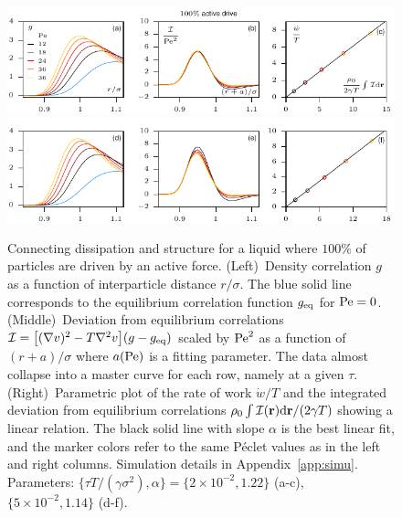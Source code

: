 \documentclass[superscriptaddress, twocolumn, prx, longbibliography, nofootinbib]{revtex4-1}
\begin{document}
\begin{figure}
	\centering
	\includegraphics[width=\linewidth]{fig2_ac_a.pdf}
	\includegraphics[width=\linewidth]{fig2_ac_b.pdf}
	\caption{\label{fig:fig2_ac}
		Connecting dissipation and structure for a liquid where $100\%$ of particles are driven by an active force.
		(Left)~Density correlation $g$ as a function of interparticle distance $r/\sigma$. The blue solid line corresponds to the equilibrium correlation function $g_{\rm eq}$ for ${\rm Pe}=0$.
		(Middle)~Deviation from equilibrium correlations ${\cal I} = \big[(\nabla v)^2-T\nabla^2v\big](g - g_{\rm eq})$ scaled by ${\rm Pe}^2$ as a function of $(r+a)/\sigma$ where $a({\rm Pe})$ is a fitting parameter. The data almost collapse into a master curve for each row, namely at a given $\tau$.
		(Right)~Parametric plot of the rate of work $\dot w/T$ and the integrated deviation from equilibrium correlations $\rho_0\int{\cal I}({\bf r}){\rm d}{\bf r}/(2\gamma T)$ showing a linear relation. The black solid line with slope $\alpha$ is the best linear fit, and the marker colors refer to the same P\'eclet values as in the left and right columns.
		Simulation details in Appendix~\ref{app:simu}. Parameters: $\{\tau T/(\gamma\sigma^2), \alpha\} = \{2\times10^{-2}, 1.22\}$ (a-c), $\{5\times10^{-2}, 1.14\}$ (d-f).
	}
\end{figure}
\end{document}
